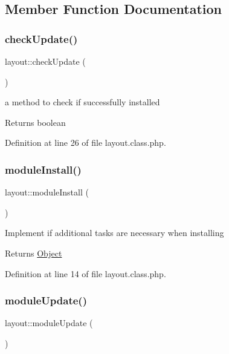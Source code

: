 \subsection{Member Function Documentation}
\hypertarget{classlayout_a756e56995ca498f4cc63b18c78bf81c5}{}\label{classlayout_a756e56995ca498f4cc63b18c78bf81c5} 
\subsubsection{\texorpdfstring{check\+Update()}{checkUpdate()}}
{\footnotesize\ttfamily layout\+::check\+Update (\begin{DoxyParamCaption}{ }\end{DoxyParamCaption})}

a method to check if successfully installed \begin{DoxyReturn}{Returns}
boolean 
\end{DoxyReturn}


Definition at line 26 of file layout.\+class.\+php.

\hypertarget{classlayout_a02df5d38eeced2b8b69d299dbdfab644}{}\label{classlayout_a02df5d38eeced2b8b69d299dbdfab644} 
\subsubsection{\texorpdfstring{module\+Install()}{moduleInstall()}}
{\footnotesize\ttfamily layout\+::module\+Install (\begin{DoxyParamCaption}{ }\end{DoxyParamCaption})}

Implement if additional tasks are necessary when installing \begin{DoxyReturn}{Returns}
\hyperlink{classObject}{Object} 
\end{DoxyReturn}


Definition at line 14 of file layout.\+class.\+php.

\hypertarget{classlayout_affc50951ec759146d27e798b7ac779ab}{}\label{classlayout_affc50951ec759146d27e798b7ac779ab} 
\subsubsection{\texorpdfstring{module\+Update()}{moduleUpdate()}}
{\footnotesize\ttfamily layout\+::module\+Update (\begin{DoxyParamCaption}{ }\end{DoxyParamCaption})}


